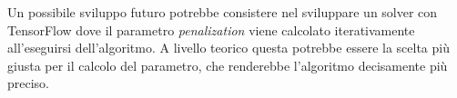 \documentclass[a4paper,12pt]{report}
\begin{document}
Un possibile sviluppo futuro potrebbe consistere nel sviluppare un solver con TensorFlow dove il parametro \textit{penalization} viene calcolato iterativamente all'eseguirsi dell'algoritmo. A livello teorico questa potrebbe essere la scelta più giusta per il calcolo del parametro, che renderebbe l'algoritmo decisamente più preciso.



%
%



\end{document}
